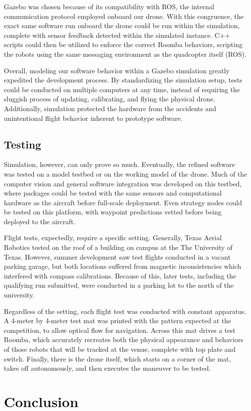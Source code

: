 \documentclass[12pt,letterpaper]{article}
\begin{document}
		Gazebo was chosen because of its compatibility with ROS, the internal communication protocol employed onboard our drone. With this congruence, the exact same software run onboard the drone could be run within the simulation, complete with sensor feedback detected within the simulated instance.  C++ scripts could then be utilized to enforce the correct Roomba behaviors, scripting the robots using the same messaging environment as the quadcopter itself (ROS).

		Overall, modeling our software behavior within a Gazebo simulation greatly expedited the development process. By standardizing the simulation setup, tests could be conducted on multiple computers at any time, instead of requiring the sluggish process of updating, calibrating, and flying the physical drone. Additionally, simulation protected the hardware from the accidents and unintentional flight behavior inherent to prototype software.

	\subsection*{Testing}
		Simulation, however, can only prove so much. Eventually, the refined software was tested on a model testbed or on the working model of the drone. Much of the computer vision and general software integration was developed on this testbed, where packages could be tested with the same sensors and computational hardware as the aircraft before full-scale deployment. Even strategy nodes could be tested on this platform, with waypoint predictions vetted before being deployed to the aircraft.

		Flight tests, expectedly, require a specific setting. Generally, Texas Aerial Robotics tested on the roof of a building on campus at the The University of Texas. However, summer development saw test flights conducted in a vacant parking garage, but both locations suffered from magnetic inconsistencies which interfered with compass calibrations. Because of this, later tests, including the qualifying run submitted, were conducted in a parking lot to the north of the university.

		Regardless of the setting, each flight test was conducted with constant apparatus. A 4-meter by 4-meter test mat was printed with the pattern expected at the competition, to allow optical flow for navigation. Across this mat drives a test Roomba, which accurately recreates both the physical appearance and behaviors of those robots that will be tracked at the venue, complete with top plate and switch. Finally, there is the drone itself, which starts on a corner of the mat, takes off autonomously, and then executes the maneuver to be tested.

\section*{Conclusion}
	\nocite{redmon2016yolo9000}
	
	
\end{document}
